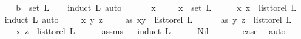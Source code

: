 \begin{isabellebody}
\ \ \isamarkupfalse%
\ \isamarkupfalse%
\ {\isachardoublequoteopen}b\ {\isasymin}\ set\ L{\isachardoublequoteclose}\ \isanewline
\ \ \isamarkupfalse%
{\isacharparenleft}{\kern0pt}induct\ L{\isacharcomma}{\kern0pt}\ auto{\isacharparenright}{\kern0pt}\ \isamarkupfalse%
\isanewline
{}\isamarkupfalse%
\ \isanewline
\ \ \isamarkupfalse%
\ x\ \isanewline
\ \ \isamarkupfalse%
\ {\isachardoublequoteopen}x\ {\isasymin}\ set\ L{\isachardoublequoteclose}\isanewline
\ \ \isamarkupfalse%
\ \isamarkupfalse%
\ {\isachardoublequoteopen}{\isacharparenleft}{\kern0pt}x{\isacharcomma}{\kern0pt}\ x{\isacharparenright}{\kern0pt}\ {\isasymin}\ list{\isacharunderscore}{\kern0pt}to{\isacharunderscore}{\kern0pt}rel\ L{\isachardoublequoteclose}\isanewline
\ \ \isamarkupfalse%
{\isacharparenleft}{\kern0pt}induct\ L{\isacharcomma}{\kern0pt}\ auto{\isacharparenright}{\kern0pt}\ \isamarkupfalse%
\isanewline
{}\isamarkupfalse%
\isanewline
\ \ \isamarkupfalse%
\ x\ y\ z\ \isanewline
\ \ \isamarkupfalse%
\ as{}{\isacharcolon}{\kern0pt}\ {\isachardoublequoteopen}{\isacharparenleft}{\kern0pt}x{\isacharcomma}{\kern0pt}y{\isacharparenright}{\kern0pt}\ {\isasymin}\ list{\isacharunderscore}{\kern0pt}to{\isacharunderscore}{\kern0pt}rel\ L{\isachardoublequoteclose}\isanewline
\ \ \ \ \ \ as{}{\isacharcolon}{\kern0pt}\ {\isachardoublequoteopen}{\isacharparenleft}{\kern0pt}y{\isacharcomma}{\kern0pt}\ z{\isacharparenright}{\kern0pt}\ {\isasymin}\ list{\isacharunderscore}{\kern0pt}to{\isacharunderscore}{\kern0pt}rel\ L{\isachardoublequoteclose}\isanewline
\ \ \isamarkupfalse%
\ \isamarkupfalse%
\ {\isachardoublequoteopen}{\isacharparenleft}{\kern0pt}x{\isacharcomma}{\kern0pt}\ z{\isacharparenright}{\kern0pt}\ {\isasymin}\ list{\isacharunderscore}{\kern0pt}to{\isacharunderscore}{\kern0pt}rel\ L{\isachardoublequoteclose}\isanewline
\ \ \ \ \isamarkupfalse%
\ assms\isanewline
\ \ \isamarkupfalse%
{\isacharparenleft}{\kern0pt}induct\ L{\isacharparenright}{\kern0pt}\isanewline
\ \ \ \ \isamarkupfalse%
\ Nil\isanewline
\ \ \ \ \isamarkupfalse%
\ \isamarkupfalse%
\ {\isacharquery}{\kern0pt}case\ \isamarkupfalse%
\ auto\isanewline
\ \ \isamarkupfalse%
\isanewline
\ \ \ \ \isamarkupfalse%

\end{isabellebody}
